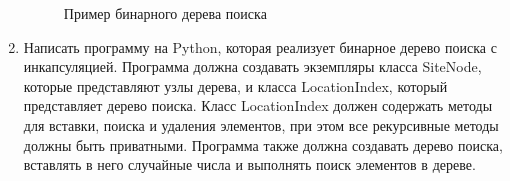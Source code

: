 \begin{enumerate}
\begin{figure}[h]
\centering
{}
\caption{Пример бинарного дерева поиска}
\end{figure}

\item Написать программу на Python, которая реализует бинарное дерево поиска с инкапсуляцией. Программа должна создавать экземпляры класса SiteNode, которые представляют узлы дерева, и класса LocationIndex, который представляет дерево поиска. Класс LocationIndex должен содержать методы для вставки, поиска и удаления элементов, при этом все рекурсивные методы должны быть приватными. Программа также должна создавать дерево поиска, вставлять в него случайные числа и выполнять поиск элементов в дереве.


\end{enumerate}
